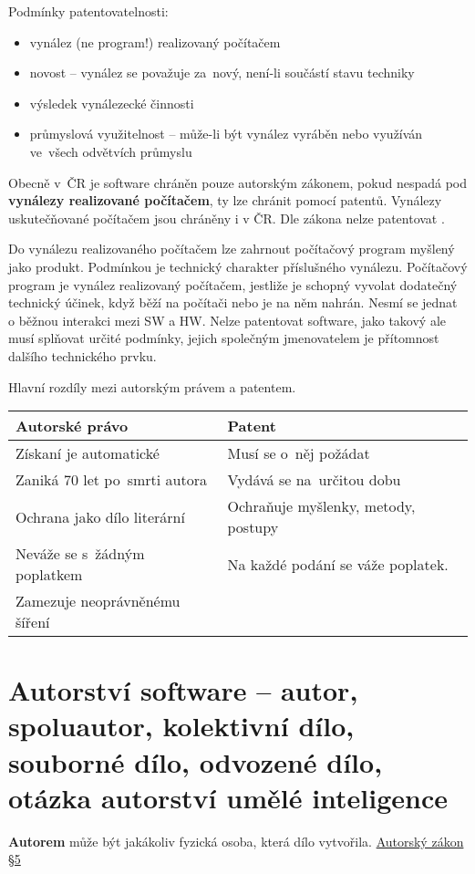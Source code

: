 \noindent Podmínky patentovatelnosti:
\begin{itemize} 
	\item vynález (ne program!) realizovaný počítačem
	\item novost -- vynález se považuje za~nový, není-li součástí stavu techniky
	\item výsledek vynálezecké činnosti
	\item průmyslová využitelnost -- může-li být vynález vyráběn nebo využíván ve~všech odvětvích průmyslu
\end{itemize}
Obecně v~ČR je software chráněn pouze autorským zákonem, pokud nespadá pod \textbf{vynálezy realizované počítačem}, ty lze chránit pomocí patentů.  
Vynálezy uskutečňované počítačem jsou chráněny i v ČR. Dle zákona nelze patentovat .

Do vynálezu realizovaného počítačem lze zahrnout počítačový program myšlený jako produkt. Podmínkou je technický charakter příslušného vynálezu. Počítačový program je vynález realizovaný počítačem, jestliže je schopný vyvolat dodatečný technický účinek, když běží na počítači nebo je na něm nahrán. Nesmí se jednat o běžnou interakci mezi SW a HW. Nelze patentovat software, jako takový ale musí splňovat určité podmínky, jejich společným jmenovatelem je přítomnost dalšího technického prvku. 

Hlavní rozdíly mezi autorským právem a patentem.

\begin{center}
	\begin{tabular}{|l|l|}
	\hline
		Autorské právo & Patent \\\hline
		Získaní je automatické & Musí se o~něj požádat\\\hline
		Zaniká 70 let po~smrti autora & Vydává se na~určitou dobu\\\hline
		Ochrana jako dílo literární & Ochraňuje myšlenky, metody, postupy\\\hline
		Neváže se s~žádným poplatkem & Na každé podání se váže poplatek.\\\hline
		Zamezuje neoprávněnému šíření & \\\hline
	\end{tabular}
\end{center}

\clearpage
\section{Autorství software -- autor, spoluautor, kolektivní dílo, souborné dílo, odvozené dílo, otázka autorství umělé inteligence}
\textbf{Autorem} může být jakákoliv fyzická osoba, která dílo vytvořila. \href{https://www.zakonyprolidi.cz/cs/2000-121#p5}{Autorský zákon §5}

